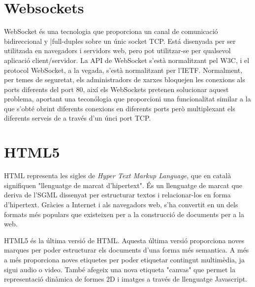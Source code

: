 

\section{Websockets}

WebSocket és una tecnologia que proporciona un canal de comunicació bidireccional y |full-duples sobre un únic socket TCP. Está disenyada per ser utilitzada en navegadors i servidors web, pero pot utilitzar-se per qualsevol aplicació client/servidor. La API de WebSocket s'està normalitzant pel W3C, i el protocol WebSocket, a la vegada, s'està normalitzant per l'IETF. Normalment, per temes de seguretat, els administradors de xarxes bloquejen les conexions als ports diferents del port 80, així els WebSockets pretenen solucionar aquest problema, aportant una teconólogia que proporcioni una funcionalitat similar a la que s'obté obrint diferents conexions en diferents ports però multiplexant els diferents serveis de a través d'un únci port TCP.

\section{HTML5}

HTML representa les sigles de \emph{Hyper Text Markup Language}, que en català signifiquen "llenguatge de marcat d'hipertext". És un llenguatge de marcat que deriva de l'SGML dissenyat per estructurar textos i relacionar-los en forma d'hipertext. Gràcies a Internet i als navegadors web, s'ha convertit en un dels formats més populars que existeixen per a la construcció de documents per a la web. 

HTML5 és la última versió de HTML. Aquesta última versió proporciona noves marques per poder estructurar els documents d'una forma més semantica. A més a més proporciona noves etiquetes per poder etiquetar contingut multimèdia, ja sigui audio o video. També afegeix una nova etiqueta "canvas" que permet la representació dinàmica de formes 2D i imatges a través de llenguatge Javascript. 

